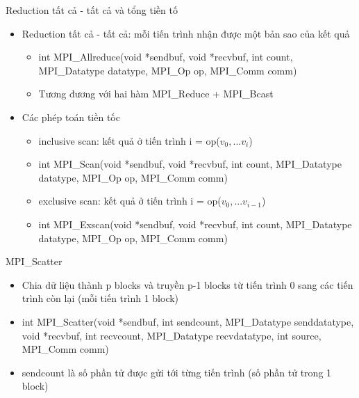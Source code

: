 \documentclass[10pt]{beamer}
\theoremstyle{remark}
\numberwithin{algocf}{section}
\numberwithin{equation}{section}
\numberwithin{dl}{section}
\numberwithin{figure}{section}
\begin{document}
\begin{frame}{Reduction tất cả - tất cả và tổng tiền tố}
    \begin{itemize}
        \item Reduction tất cả - tất cả: mỗi tiến trình nhận được một bản sao của kết quả
        \begin{itemize}
            \item int MPI\_Allreduce(void *sendbuf, void *recvbuf,
                                    int count, MPI\_Datatype datatype,
                                    MPI\_Op op, MPI\_Comm comm)

           \item Tương đương với hai hàm MPI\_Reduce + MPI\_Bcast
        \end{itemize}
        \item Các phép toán tiền tốc
        \begin{itemize}
            \item inclusive scan: kết quả ở tiến trình i = op($v_0, ... v_i$) 
            \item int MPI\_Scan(void *sendbuf, void *recvbuf, int count,
                               MPI\_Datatype datatype, MPI\_Op op,
                               MPI\_Comm comm)
            \item exclusive scan: kết quả ở tiến trình i = op($v_0, ... v_{i-1}$) 
            \item int MPI\_Exscan(void *sendbuf, void *recvbuf, int count,
                                  MPI\_Datatype datatype, MPI\_Op op,
                                  MPI\_Comm comm)
           
        \end{itemize}
    \end{itemize}
\end{frame}

\begin{frame}{MPI\_Scatter}
    \begin{itemize}
        \item Chia dữ liệu thành p blocks và truyền p-1 blocks từ tiến trình 0 sang các tiến trình còn lại (mỗi tiến trình 1 block)
        \item int MPI\_Scatter(void *sendbuf, int sendcount,
                               MPI\_Datatype senddatatype, void *recvbuf,
                               int recvcount, MPI\_Datatype recvdatatype,
                               int source, MPI\_Comm comm) 
        \item sendcount là số phần tử được gửi tới từng tiến trình (số phần tử trong 1 block)
    \end{itemize}
\end{frame}
\end{document}

